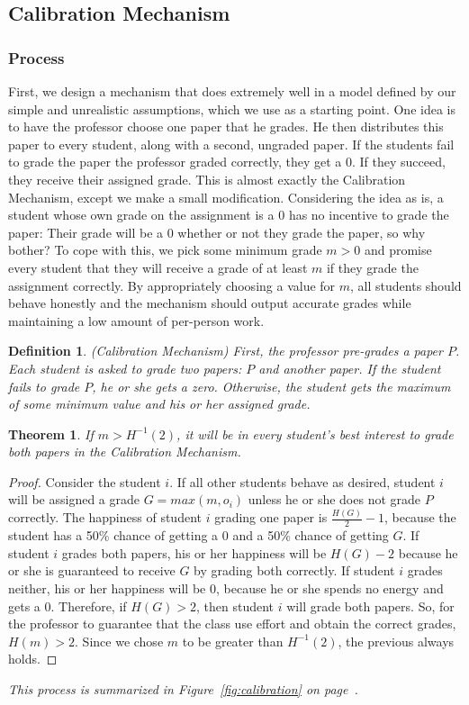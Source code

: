 \documentclass[12pt, Arial]{article}
\newtheorem{theorem}{Theorem}
\newtheorem{definition}{Definition}
\begin{document}
\subsection{Calibration Mechanism}
\label{sec:calibration}




\subsubsection{Process}
First, we design a mechanism that does extremely well in a model defined by our simple and unrealistic assumptions, which we use as a starting point.
One idea is to have the professor choose one paper that he grades. He then distributes this paper to every student, along with a second, ungraded paper. If the students fail to grade the paper the professor graded correctly, they get a 0. If they succeed, they receive their assigned grade.
This is almost exactly the Calibration Mechanism, except we make a small modification. Considering the idea as is, a student whose own grade on the assignment is a 0 has no incentive to grade the paper: Their grade will be a 0 whether or not they grade the paper, so why bother? To cope with this, we pick some minimum grade $m > 0$ and promise every student that they will receive a grade of at least $m$ if they grade the assignment correctly.
By appropriately choosing a value for $m$, all students should behave honestly and the mechanism should output accurate grades while maintaining a low amount of per-person work.
\begin{definition}(Calibration Mechanism)
First, the professor pre-grades a paper $P$. Each student is asked to grade two papers: $P$ and another paper. If the student fails to grade $P$, he or she gets a zero. Otherwise, the student gets the maximum of some minimum value and his or her assigned grade.
\end{definition}
\begin{theorem}
If $m>H^{-1}(2)$, it will be in every student's best interest to grade both papers in the Calibration Mechanism.
\end{theorem}
\begin{proof}
Consider the student $i$.
If all other students behave as desired, student $i$ will be assigned a grade $G=max(m,o_i)$ unless he or she does not grade $P$ correctly.
The happiness of student $i$ grading one paper is $\frac{H(G)}{2}-1$, because the student has a 50\% chance of getting a 0 and a 50\% chance of getting $G$.
If student $i$ grades both papers, his or her happiness will be $H(G)-2$ because he or she is guaranteed to receive $G$ by grading both correctly.
If student $i$ grades neither, his or her happiness will be $0$, because he or she spends no energy and gets a 0.
Therefore, if $H(G) > 2$, then student $i$ will grade both papers. So, for the professor to guarantee that the class use effort and obtain the correct grades, $H(m) > 2$.
Since we chose $m$ to be greater than $H^{-1}(2)$, the previous always holds.
\end{proof}
\emph{This process is summarized in Figure~\ref{fig:calibration} on page~\pageref{fig:calibration}.}
\end{document}
